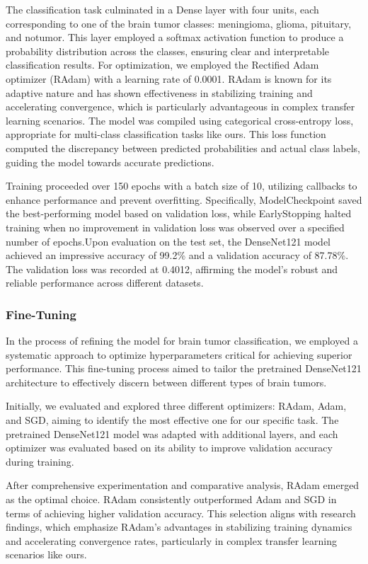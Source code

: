 The classification task culminated in a Dense layer with four units, each corresponding to one of the brain tumor classes: meningioma, glioma, pituitary, and notumor. This layer employed a softmax activation function to produce a probability distribution across the classes, ensuring clear and interpretable classification results. For optimization, we employed the Rectified Adam optimizer (RAdam) with a learning rate of 0.0001. RAdam is known for its adaptive nature and has shown effectiveness in stabilizing training and accelerating convergence, which is particularly advantageous in complex transfer learning scenarios. The model was compiled using categorical cross-entropy loss, appropriate for multi-class classification tasks like ours. This loss function computed the discrepancy between predicted probabilities and actual class labels, guiding the model towards accurate predictions.

Training proceeded over 150 epochs with a batch size of 10, utilizing callbacks to enhance performance and prevent overfitting. Specifically, ModelCheckpoint saved the best-performing model based on validation loss, while EarlyStopping halted training when no improvement in validation loss was observed over a specified number of epochs.Upon evaluation on the test set, the DenseNet121 model achieved an impressive accuracy of 99.2\% and a validation accuracy of 87.78\%. The validation loss was recorded at 0.4012, affirming the model's robust and reliable performance across different datasets.

\subsubsection{Fine-Tuning}

In the process of refining the model for brain tumor classification, we employed a systematic approach to optimize hyperparameters critical for achieving superior performance. This fine-tuning process aimed to tailor the pretrained DenseNet121 architecture to effectively discern between different types of brain tumors.

Initially, we evaluated and explored three different optimizers: RAdam, Adam, and SGD, aiming to identify the most effective one for our specific task. The pretrained DenseNet121 model was adapted with additional layers, and each optimizer was evaluated based on its ability to improve validation accuracy during training.

After comprehensive experimentation and comparative analysis, RAdam emerged as the optimal choice. RAdam consistently outperformed Adam and SGD in terms of achieving higher validation accuracy. This selection aligns with research findings, which emphasize RAdam's advantages in stabilizing training dynamics and accelerating convergence rates, particularly in complex transfer learning scenarios like ours.

